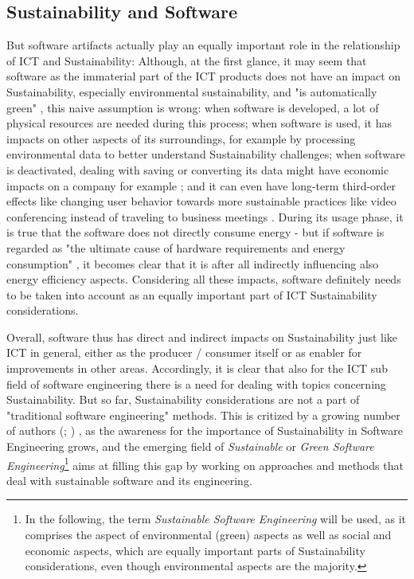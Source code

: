 \documentclass[oribibl]{llncs}
\begin{document}
\subsection{Sustainability and Software}
But software artifacts actually play an equally important role in the relationship of ICT and Sustainability: %
Although, at the first glance, it may seem that software as the immaterial %
part of the ICT products does not have an impact on Sustainability, especially environmental sustainability, and "is automatically green" \cite{agarwal_sustainable_2012}, this naive assumption is wrong: when software is developed, a lot of physical resources are needed during this process; when software is used, it has impacts on other aspects of its surroundings, for example by processing environmental data to better understand Sustainability challenges; when software is deactivated, dealing with saving or converting its data might have economic impacts on a company for example \cite{johann_sustainable_2011}; and it can even have long-term third-order effects like changing user behavior towards more sustainable practices like video conferencing instead of traveling to business meetings \cite{amsel_toward_2011}. %
During its usage phase, it is true that the software does not directly consume energy - but if software is regarded as "the ultimate cause of hardware requirements and energy consumption" \cite{kern_impacts_2015}, it becomes clear that it is after all indirectly influencing also energy efficiency aspects. Considering all these impacts, software definitely needs to be taken into account as an equally important part of ICT Sustainability considerations.

Overall, software thus has direct and indirect impacts on Sustainability just like ICT in general, either as the producer / consumer itself or as enabler for improvements in other areas. %
Accordingly, it is clear that also for the ICT sub field of software engineering %
there is a need for dealing with topics concerning Sustainability. But so far, Sustainability considerations are not a part of "traditional software engineering" \cite{penzenstadler_supporting_2012} methods.  This is critized by a growing number of authors (\cite{penzenstadler_supporting_2012}; \cite{agarwal_sustainable_2012}) %
, as the awareness for the importance of Sustainability in Software Engineering grows, and the emerging field of \textit{Sustainable} or \textit{Green Software Engineering}\footnote{In the following, the term \textit{Sustainable Software Engineering} will be used, as it comprises the aspect of environmental (green) aspects as well as social and economic aspects, which are equally important parts of Sustainability considerations, even though environmental aspects are the majority.} aims at filling this gap by %
working on approaches and methods that deal with sustainable software and its engineering.
\end{document}
